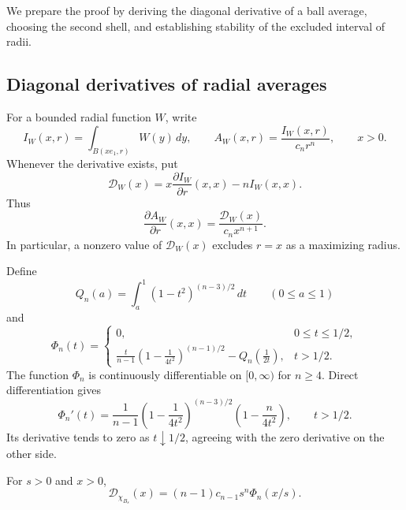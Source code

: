 \documentclass[12pt]{amsart}
\numberwithin{equation}{section}
\begin{document}
We prepare the proof by deriving the diagonal derivative of a ball
average, choosing the second shell, and establishing stability of
the excluded interval of radii.

\subsection{Diagonal derivatives of radial averages}

For a bounded radial function $W$, write
\[
I_W(x,r)=\int_{B(xe_1,r)}W(y)\,dy,
\qquad A_W(x,r)=\frac{I_W(x,r)}{c_nr^n},\qquad x>0.
\]
Whenever the derivative exists, put
\[
\mathcal D_W(x)=x\frac{\partial I_W}{\partial r}(x,x)-nI_W(x,x).
\]
Thus
\begin{equation}
\label{n_dimensional_diagonal_derivative}
\frac{\partial A_W}{\partial r}(x,x)
       =\frac{\mathcal D_W(x)}{c_nx^{n+1}}.
\end{equation}
In particular, a nonzero value of $\mathcal D_W(x)$ excludes $r=x$
as a maximizing radius.

Define
\[
Q_n(a)=\int_a^1(1-t^2)^{(n-3)/2}\,dt\qquad(0\leq a\leq1)
\]
and
\begin{equation}
\label{n_dimensional_phi}
\Phi_n(t)=
\begin{cases}
0,&0\leq t\leq1/2,\\[4pt]
\displaystyle
\frac{t}{n-1}\left(1-\frac{1}{4t^2}\right)^{(n-1)/2}
 -Q_n\!\left(\frac{1}{2t}\right),&t>1/2.
\end{cases}
\end{equation}
The function $\Phi_n$ is continuously differentiable on $[0,\infty)$
for $n\geq4$. Direct differentiation gives
\begin{equation}
\label{n_dimensional_phi_derivative}
\Phi_n'(t)=\frac{1}{n-1}
 \left(1-\frac{1}{4t^2}\right)^{(n-3)/2}
 \left(1-\frac{n}{4t^2}\right),\qquad t>1/2.
\end{equation}
Its derivative tends to zero as $t\downarrow1/2$, agreeing with the
zero derivative on the other side.

\begin{lemma}
\label{n_dimensional_ball_derivative}
For $s>0$ and $x>0$,
\begin{equation}
\label{n_dimensional_ball_kernel}
\mathcal D_{\chi_{B_s}}(x)
       =(n-1)c_{n-1}s^n\Phi_n(x/s).
\end{equation}
\end{lemma}
\end{document}
